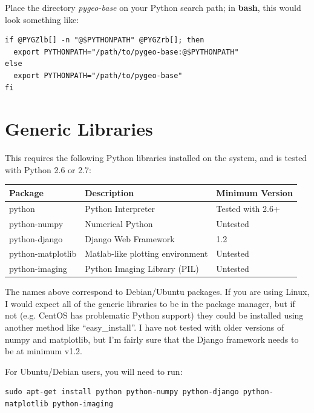 \documentclass[letterpaper,10pt,english]{sphinxmanual}
\begin{document}
Place the directory \emph{pygeo-base} on your Python search path; in \textbf{bash}, this would look something like:

\begin{Verbatim}[commandchars=@\[\]]
if @PYGZlb[] -n "@$PYTHONPATH" @PYGZrb[]; then
  export PYTHONPATH="/path/to/pygeo-base:@$PYTHONPATH"
else
  export PYTHONPATH="/path/to/pygeo-base"
fi
\end{Verbatim}


\section{Generic Libraries}
\label{installation:generic-libraries}
This requires the following Python libraries installed on the system, and is tested with Python 2.6 or 2.7:

\begin{tabulary}{\linewidth}{|L|L|L|}
\hline
\textbf{
Package
} & \textbf{
Description
} & \textbf{
Minimum Version
}\\
\hline

python
 & 
Python Interpreter
 & 
Tested with 2.6+
\\

python-numpy
 & 
Numerical Python
 & 
Untested
\\

python-django
 & 
Django Web Framework
 & 
1.2
\\

python-matplotlib
 & 
Matlab-like plotting environment
 & 
Untested
\\

python-imaging
 & 
Python Imaging Library (PIL)
 & 
Untested
\\
\hline
\end{tabulary}


The names above correspond to Debian/Ubuntu packages.  If you are using Linux, I would expect all of the generic libraries to be in the package manager, but if not (e.g. CentOS has problematic Python support) they could be installed using another method like ``easy\_install''.  I have not tested with older versions of numpy and matplotlib, but I'm fairly sure that the Django framework needs to be at minimum v1.2.

For Ubuntu/Debian users, you will need to run:

\begin{Verbatim}[commandchars=@\[\]]
sudo apt-get install python python-numpy python-django python-matplotlib python-imaging
\end{Verbatim}
\end{document}
